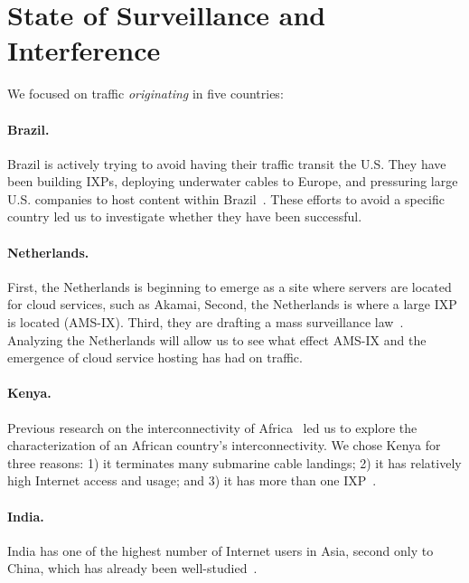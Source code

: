 \section{State of Surveillance and Interference}
\label{surv}

We focused on traffic {\em originating} in five countries:

\paragraph{Brazil.} Brazil is actively trying to avoid having their
traffic transit the U.S. They have been building IXPs,
deploying underwater cables to Europe, and pressuring large
U.S. companies to host content within Brazil~\cite{brazil_history,
  brazil_break_from_US, brazil_conference, 
  brazil_conference2, brazil_human_rights, brazil_cable,
  brazil_us_companies, brazil_IXP1}.  These efforts to avoid 
a specific country led us to investigate whether they
have been successful. 

\paragraph{Netherlands.}  First, the Netherlands is beginning to emerge
as a site where servers are located for cloud services, such as Akamai,
Second, the Netherlands is where a large IXP is located (AMS-IX). Third, they
are drafting a mass surveillance
law~\cite{netherlands_surveillance}. Analyzing the Netherlands will
allow us to see what effect AMS-IX and the emergence of cloud service
hosting has had on traffic. 

\paragraph{Kenya.} Previous research on the interconnectivity of
Africa~\cite{gupta2014peering, fanou2015diversity} led us to explore the
characterization of an African country's interconnectivity.  We chose
Kenya for three reasons: 1) it terminates many submarine cable landings;
2) it has relatively high Internet access and usage; and 3) it has more
than one IXP~\cite{kenya_nigeria, teams}. 

\paragraph{India.}  India has one of the highest number of Internet
users in Asia, second only to China, which has already been
well-studied~\cite{tsui2003panopticon, wang2010discourse}.  

